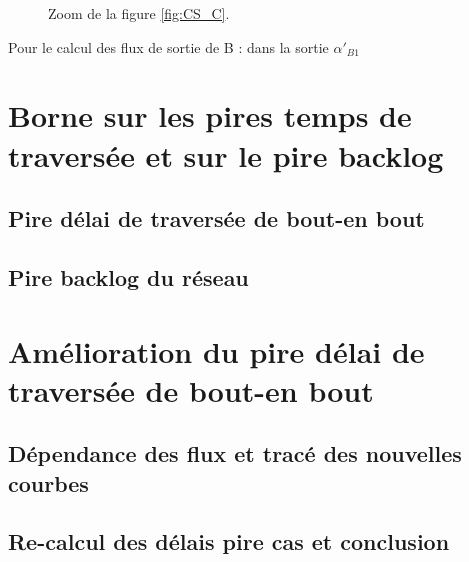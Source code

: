 \begin{figure}[!ht]
\begin{minipage}{.48\textwidth}
\caption{\label{fig:CS_C-2}Zoom de la figure \ref{fig:CS_C}.}%
\end{minipage}%
\end{figure} 

Pour le calcul des flux de sortie de B : dans la sortie $\alpha'_{B1}$

\section{Borne sur les pires temps de traversée et sur le pire backlog}

\subsection{Pire délai de traversée de bout-en bout}

\subsection{Pire backlog du réseau}

\section{Amélioration du pire délai de traversée de bout-en bout}
\subsection{Dépendance des flux et tracé des nouvelles courbes}
\subsection{Re-calcul des délais pire cas et conclusion}